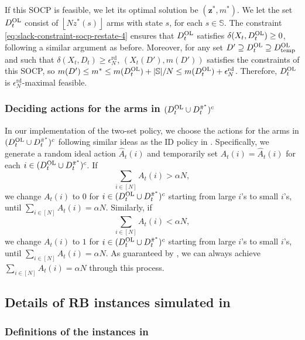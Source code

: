 \documentclass[11pt,letterpaper]{article}
\theoremstyle{plain}
\theoremstyle{definition}
\theoremstyle{remark}
\newcommand{\floor}[1]{\left\lfloor#1\right\rfloor}
\newcommand{\ve}[1]{\bm{#1}}
\newcommand{\sspa}{\mathbb{S}}
\newcommand{\sumN}{\sum_{i\in[N]}}
\newcommand{\pibar}{{\sysbar{\pi}}}
\newcommand{\pibs}{{\pibar^*}}
\newcommand{\syshat}[1]{\widehat{#1}}
\newcommand{\sysbar}[1]{\bar{#1}}
\newcommand{\errtol}{\epsilon_N^{\text{rd}}}
\newcommand{\Da}{D^{\pibs}}
\newcommand{\Db}{D^{\textup{OL}}}
\newcommand{\Dtemp}{\Db_{\textup{temp}}}
\newcommand{\slk}{\delta}
\begin{document}
If this SOCP is feasible, we let its optimal solution be $(\ve{z}^*, m^*)$. We let the set $\Db_t$ consist of $\floor{Nz^*(s)}$ arms with state $s$, for each $s\in\sspa$. 
The constraint \eqref{eq:slack-constraint-socp-restate-4} ensures that $\Db_t$ satisfies $\slk(X_t, \Db_t) \geq 0$, following a similar argument as before. 
Moreover, for any set $D'\supseteq \Db_t\supseteq \Dtemp$ and such that $\slk(X_t, D_t)\geq \errtol$, $(X_t(D'), m(D'))$ satisfies the constraints of this SOCP, so $m(D') \leq m^* \leq m(\Db_t) + |\sspa| / N \leq m(\Db_t) + \errtol$. Therefore, $\Db_t$ is $\errtol$-maximal feasible. 



\subsubsection{Deciding actions for the arms in $(\Db_t\cup \Da_t)^c$}
\label{app:exp-details:decide-actions-outside}
In our implementation of the two-set policy, we choose the actions for the arms in $(\Db_t\cup \Da_t)^c$ following similar ideas as the ID policy in \cite{HonXieCheWan_24}. 
Specifically, we generate a random ideal action $\syshat{A}_t(i)$ and temporarily set $A_t(i) = \syshat{A}_t(i)$ for each $i\in (\Db_t\cup \Da_t)^c$. If 
\[
    \sumN A_t(i) > \alpha N, 
\]
we change $A_t(i)$ to $0$ for $i\in(\Db_t\cup \Da_t)^c$ starting from large $i$'s to small $i$'s, until $\sumN A_t(i) = \alpha N$. 
Similarly, if 
\[
    \sumN A_t(i) < \alpha N, 
\]
we change $A_t(i)$ to $1$ for $i\in(\Db_t\cup \Da_t)^c$ starting from large $i$'s to small $i$'s, until $\sumN A_t(i) = \alpha N$. As guaranteed by , we can always achieve $\sumN A_t(i) = \alpha N$ through this process. 
 







\subsection{Details of RB instances simulated in }
\label{app:exp-details:examples}

\subsubsection{Definitions of the instances in }
\end{document}
